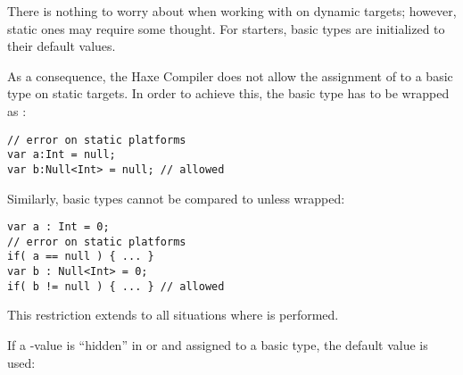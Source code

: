 
There is nothing to worry about when working with  on dynamic targets; however, static ones may require some thought. For starters, basic types are initialized to their default values.


As a consequence, the Haxe Compiler does not allow the assignment of  to a basic type on static targets. In order to achieve this, the basic type has to be wrapped as :

\begin{lstlisting}
// error on static platforms
var a:Int = null;
var b:Null<Int> = null; // allowed
\end{lstlisting}

Similarly, basic types cannot be compared to  unless wrapped:

\begin{lstlisting}
var a : Int = 0;
// error on static platforms
if( a == null ) { ... }
var b : Null<Int> = 0;
if( b != null ) { ... } // allowed
\end{lstlisting}

This restriction extends to all situations where  is performed.


If a -value is ``hidden'' in  or  and assigned to a basic type, the default value is used:


